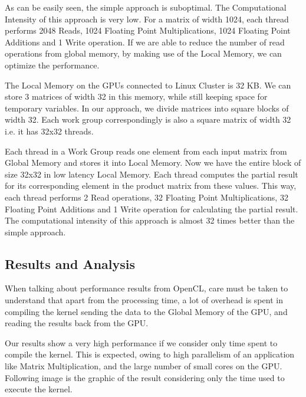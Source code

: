 \documentclass[]{scrartcl}
\begin{document}
As can be easily seen, the simple approach is suboptimal. The Computational Intensity of this approach is very low. For a matrix of width 1024, each thread performs 2048 Reads, 1024 Floating Point Multiplications, 1024 Floating Point Additions and 1 Write operation. If we are able to reduce the number of read operations from global memory, by making use of the Local Memory, we can optimize the performance. 

The Local Memory on the GPUs connected to Linux Cluster is 32 KB. We can store 3 matrices of width 32 in this memory, while still keeping space for temporary variables. In our approach, we divide
matrices into square blocks of width 32. Each work group correspondingly is also a square matrix of width 32 i.e. it has 32x32 threads. 

Each thread in a Work Group reads one element from each input matrix from Global Memory
and stores it into Local Memory. Now we have the entire block of size 32x32 in low latency Local Memory. Each thread computes the partial result for its corresponding element in the product matrix
from these values. This way, each thread performs 2 Read operations, 32 Floating Point
Multiplications, 32 Floating Point Additions and 1 Write operation for calculating the partial result. The computational intensity of this approach is almost 32 times better than the simple approach.

\subsection{Results and Analysis}
When talking about performance results from OpenCL, care must be taken to understand that apart from the processing time,
a lot of overhead is spent in compiling the kernel sending the data to the Global Memory of the GPU, and reading the results
back from the GPU. 

Our results show a very  high performance if we consider only time spent to compile the kernel. This is expected, owing to high
parallelism of an application like Matrix Multiplication, and the large number of small cores on the GPU. Following image is the
graphic of the result considering only the time used to execute the kernel.
\end{document}

